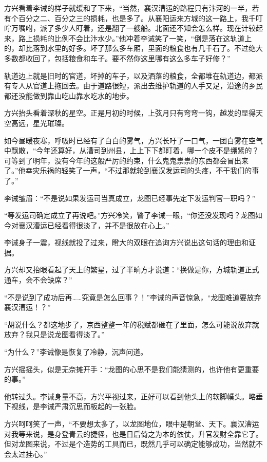 方兴看着李诫的样子就缓和了下来，“当然，襄汉漕运的路程只有汴河的一半，若有个百分之二、百分之三的损耗，也是多了。从襄阳运来方城的这一路上，我千叮咛万嘱咐，派了多少人盯着，还是翻了一艘船。北面还不知会怎么样。现在计较起来，路上损耗的比例不会比汴水少。”他冲着李诫笑了一笑，“倒是落在这轨道上的，却比落到水里的好多。坏了那么多车厢，里面的粮食也有几千石了。不过绝大多数都收回了，包括粮食和车子。要不然你这里哪有这么多车子好修？”

轨道边上就是旧时的官道，坏掉的车子，以及洒落的粮食，全都堆在轨道边，都派有专人从官道上拖回去。由于道路很短，派出去维护轨道的人手又足，沿途的乡民都还没能做到靠山吃山靠水吃水的地步。

方兴抬头看着深秋的星空。正是月初的时候，上弦月只有弯弯一钩，越发的显得天空高远，星光璀璨。

如今昼暖夜寒，呼吸时已经有了白白的雾气，方兴长吁了一口气，一团白雾在空气中飘散，“今年还算好，从漕司到州县，上上下下都盯着，哪一个皮不是绷紧的？可等到了明年，没有今年的这般严厉的约束，什么鬼鬼祟祟的东西都会冒出来了。”他幸灾乐祸的轻笑了一声，“不过那就轮到襄汉发运司的头疼，不干我们的事了。”

李诫皱眉：“不是说如果发运司当真成立，龙图已经事先定下发运判官一职吗？”

“等发运司确定成立了再说吧。”方兴冷笑，瞥了李诫一眼，“你还没发现吗？龙图如今对襄汉漕运已经看得很淡了，并不是很放在心上。”

李诫身子一震，视线就投了过来，瞪大的双眼在追询方兴说出这句话的理由和证据。

方兴却又抬眼看起了天上的繁星，过了半晌方才说道：“换做是你，方城轨道正式通车，会不会缺席？”

“不是说到了成功后再……究竟是怎么回事？！”李诫的声音惊急，“龙图难道要放弃襄汉漕运！？”

“胡说什么？都这地步了，京西整整一年的税赋都砸在了里面，怎么可能说放弃就放弃？我只是说龙图看得淡了。”

“为什么？”李诫像是恢复了冷静，沉声问道。

方兴摇摇头，似是无奈摊开手：“龙图的心思不是我们能猜测的，也许他有更重要的事。”

他转过头。李诫身量不高，方兴平视过来，正好可以看到他头上的软脚幞头。略垂下视线，是李诫严肃沉思而板起的一张脸。

方兴呵呵笑了一声，“不要想太多了，以龙图地位，眼中是朝堂、天下。襄汉漕运对我等来说，是身登青云的捷径，也是日后倚之为本的依仗，升官发财全靠它了。但对龙图来说，不过是个造势的工具而已，既然几乎可以确定能够成功，当然就不会太过挂心。”

